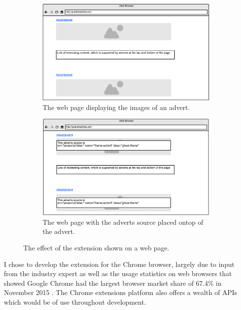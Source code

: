 \documentclass[12pt]{article}
\begin{document}
\begin{figure}[H]
    \begin{subfigure}{0.3\textwidth}
        \includegraphics[scale=0.25]{siteWithAds.png}
        \caption{The web page displaying the images of an advert.}
        \label{fig:siteWithAds}
    \end{subfigure} \hspace{0.2\textwidth}
    \begin{subfigure}{0.3\textwidth}
        \includegraphics[scale=0.25]{siteWithAdSource.png}
        \caption{The web page with the adverts source placed ontop of the advert.}
        \label{fig:siteWithAdSource}
    \end{subfigure}
    \caption{The effect of the extension shown on a web page.}
    \label{fig:mockup}
\end{figure}

I chose to develop the extension for the Chrome browser, largely due to input from the industry expert as well as the usage statistics on web browsers that showed Google Chrome had the largest browser market share of 67.4\% in November 2015 \parencite{browserStats}. The Chrome extensions platform also offers a wealth of APIs which would be of use throughout development. \\
\end{document}
